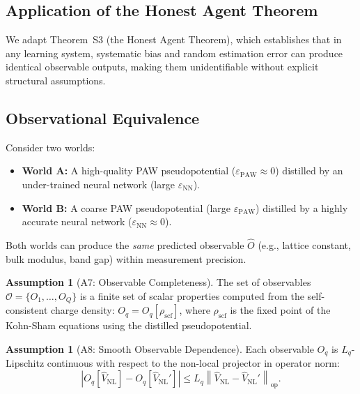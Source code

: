 \documentclass[11pt,a4paper]{article}
\theoremstyle{definition}
\newtheorem{assumption}[theorem]{Assumption}
\newcommand{\norm}[1]{\left\lVert#1\right\rVert}
\newcommand{\ThmSCXHonest}{Theorem~S3}
\begin{document}
\subsection{Application of the Honest Agent Theorem}

We adapt \ThmSCXHonest{} (the Honest Agent Theorem), which establishes that in any learning system, systematic bias and random estimation error can produce identical observable outputs, making them unidentifiable without explicit structural assumptions.

\subsection{Observational Equivalence}

Consider two worlds:

\begin{itemize}
    \item \textbf{World A:} A high-quality PAW pseudopotential ($\varepsilon_{\mathrm{PAW}} \approx 0$) distilled by an under-trained neural network (large $\varepsilon_{\mathrm{NN}}$).
    \item \textbf{World B:} A coarse PAW pseudopotential (large $\varepsilon_{\mathrm{PAW}}$) distilled by a highly accurate neural network ($\varepsilon_{\mathrm{NN}} \approx 0$).
\end{itemize}

Both worlds can produce the \textit{same} predicted observable $\hat{O}$ (e.g., lattice constant, bulk modulus, band gap) within measurement precision.

\begin{assumption}[A7: Observable Completeness]\label{ass:A7}
The set of observables $\mathcal{O} = \{O_1, \ldots, O_Q\}$ is a finite set of scalar properties computed from the self-consistent charge density: $O_q = O_q[\rho_{\mathrm{scf}}]$, where $\rho_{\mathrm{scf}}$ is the fixed point of the Kohn-Sham equations using the distilled pseudopotential.
\end{assumption}

\begin{assumption}[A8: Smooth Observable Dependence]\label{ass:A8}
Each observable $O_q$ is $L_q$-Lipschitz continuous with respect to the non-local projector in operator norm:
\begin{equation}
|O_q[\hat{V}_{\mathrm{NL}}] - O_q[\hat{V}_{\mathrm{NL}}']| \leq L_q \norm{\hat{V}_{\mathrm{NL}} - \hat{V}_{\mathrm{NL}}'}_{\mathrm{op}}.
\end{equation}
\end{assumption}
\end{document}
